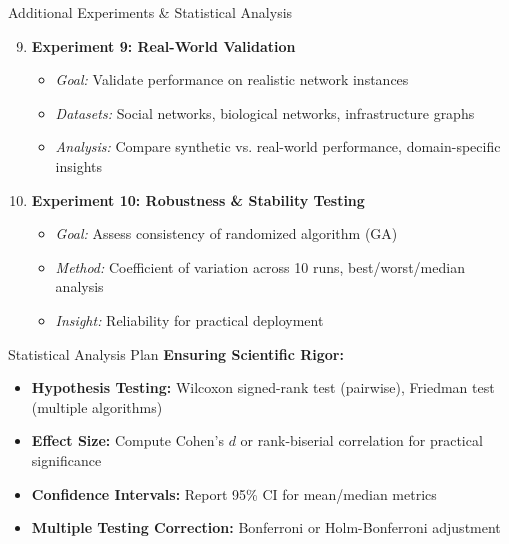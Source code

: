 \documentclass[aspectratio=169]{beamer}
\begin{document}
\begin{frame}{Additional Experiments \& Statistical Analysis}
	\begin{enumerate}
		\setcounter{enumi}{8}
		\item \textbf{Experiment 9: Real-World Validation}
		      \begin{itemize}
			      \scriptsize
			      \item \textit{Goal:} Validate performance on realistic network instances
			      \item \textit{Datasets:} Social networks, biological networks, infrastructure graphs
			      \item \textit{Analysis:} Compare synthetic vs. real-world performance, domain-specific insights
		      \end{itemize}

		      \vspace{0.2cm}
		\item \textbf{Experiment 10: Robustness \& Stability Testing}
		      \begin{itemize}
			      \scriptsize
			      \item \textit{Goal:} Assess consistency of randomized algorithm (GA)
			      \item \textit{Method:} Coefficient of variation across 10 runs, best/worst/median analysis
			      \item \textit{Insight:} Reliability for practical deployment
		      \end{itemize}
	\end{enumerate}

	\vspace{0.2cm}

	\begin{block}{Statistical Analysis Plan}
		\textbf{Ensuring Scientific Rigor:}
		\begin{itemize}
			\item \textbf{Hypothesis Testing:} Wilcoxon signed-rank test (pairwise), Friedman test (multiple algorithms)
			\item \textbf{Effect Size:} Compute Cohen's $d$ or rank-biserial correlation for practical significance
			\item \textbf{Confidence Intervals:} Report 95\% CI for mean/median metrics
			\item \textbf{Multiple Testing Correction:} Bonferroni or Holm-Bonferroni adjustment
		\end{itemize}
	\end{block}
\end{frame}
\end{document}
